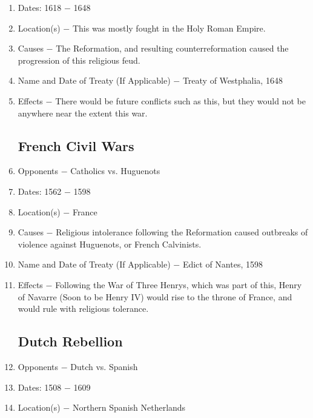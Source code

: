 \documentclass[12pt]{article}
\begin{document}
\begin{enumerate}
\item Dates: 1618 $-$ 1648

\item Location(s) $-$ This was mostly fought in the Holy Roman Empire.

\item Causes $-$ The Reformation, and resulting counterreformation caused the progression of this religious feud.

\item Name and Date of Treaty (If Applicable) $-$ Treaty of Westphalia, 1648

\item Effects $-$ There would be future conflicts such as this, but they would not be anywhere near the extent this war. 

\subsection{French Civil Wars}
 
\item Opponents $-$ Catholics vs. Huguenots

\item Dates: 1562 $-$ 1598

\item Location(s) $-$ France

\item Causes $-$ Religious intolerance following the Reformation caused outbreaks of violence against Huguenots, or French Calvinists.

\item Name and Date of Treaty (If Applicable) $-$ Edict of Nantes, 1598

\item Effects $-$ Following the War of Three Henrys, which was part of this, Henry of Navarre (Soon to be Henry IV) would rise to the throne of France, and would rule with religious tolerance. 

\subsection{Dutch Rebellion}

\item Opponents $-$ Dutch vs. Spanish

\item Dates: 1508 $-$ 1609

\item Location(s) $-$ Northern Spanish Netherlands


\end{enumerate}
\end{document}
